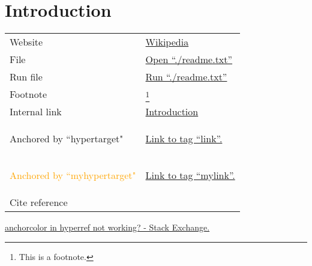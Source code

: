 \documentclass{article}
\newcommand{\myhypertarget}[3][orange]{\hypertarget{#2}{\textcolor{#1}{#3}}}
\begin{document}
	\tableofcontents
	\section{Introduction}
	\label{sec-introduction}
	\begin{tabular}{ll}
		Website & \href{www.wikipedia.com}{Wikipedia}\\
		File & \href{readme.txt}{Open ``./readme.txt''}\\
		Run file & \href{run:readme.txt}{Run ``./readme.txt''}\\
		Footnote & \footnote{This is a footnote.}\\
		Internal link & \hyperref[sec-introduction]{Introduction}\\
		\hypertarget{link}{Anchored by ``hypertarget"} & \hyperlink{link}{Link to tag ``link''.}\\
		\myhypertarget{mylink}{Anchored by ``myhypertarget"} & \hyperlink{mylink}{Link to tag ``mylink''.}\\
		Cite reference & \cite{b1}\\
	\end{tabular}

		\begin{thebibliography}{00}
		 \href{https://tex.stackexchange.com/questions/478463/anchorcolor-in-hyperref-not-working}{anchorcolor in hyperref not working? - Stack Exchange.}
\end{thebibliography}
\end{document}
